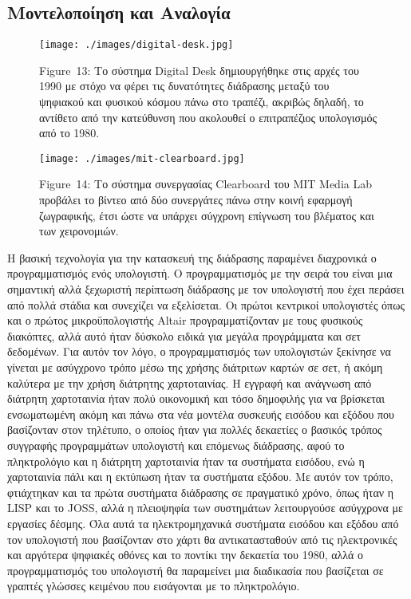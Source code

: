 \documentclass[
]{article}
\begin{document}
\hypertarget{ux3bcux3bfux3bdux3c4ux3b5ux3bbux3bfux3c0ux3bfux3afux3b7ux3c3ux3b7-ux3baux3b1ux3b9-ux3b1ux3bdux3b1ux3bbux3bfux3b3ux3afux3b1}{%
\subsection{Μοντελοποίηση και
Αναλογία}\label{ux3bcux3bfux3bdux3c4ux3b5ux3bbux3bfux3c0ux3bfux3afux3b7ux3c3ux3b7-ux3baux3b1ux3b9-ux3b1ux3bdux3b1ux3bbux3bfux3b3ux3afux3b1}}

\leavevmode{}%
\begin{figure}
\hypertarget{fig:digital-desk}{%
\centering
\texttt{[image: ./images/digital-desk.jpg]}
\caption{Figure~13: Το σύστημα Digital Desk δημιουργήθηκε στις αρχές του
1990 με στόχο να φέρει τις δυνατότητες διάδρασης μεταξύ του ψηφιακού και
φυσικού κόσμου πάνω στο τραπέζι, ακριβώς δηλαδή, το αντίθετο από την
κατεύθυνση που ακολουθεί ο επιτραπέζιος υπολογισμός από το
1980.}\label{fig:digital-desk}
}
\end{figure}

\leavevmode{}%
\begin{figure}
\hypertarget{fig:mit-clearboard}{%
\centering
\texttt{[image: ./images/mit-clearboard.jpg]}
\caption{Figure~14: Το σύστημα συνεργασίας Clearboard του MIT Media Lab
προβάλει το βίντεο από δύο συνεργάτες πάνω στην κοινή εφαρμογή
ζωγραφικής, έτσι ώστε να υπάρχει σύγχρονη επίγνωση του βλέματος και των
χειρονομιών.}\label{fig:mit-clearboard}
}
\end{figure}

Η βασική τεχνολογία για την κατασκευή της διάδρασης παραμένει διαχρονικά
ο προγραμματισμός ενός υπολογιστή. Ο προγραμματισμός με την σειρά του
είναι μια σημαντική αλλά ξεχωριστή περίπτωση διάδρασης με τον υπολογιστή
που έχει περάσει από πολλά στάδια και συνεχίζει να εξελίσεται. Οι πρώτοι
κεντρικοί υπολογιστές όπως και ο πρώτος μικροϋπολογιστής Altair
προγραμματίζονταν με τους φυσικούς διακόπτες, αλλά αυτό ήταν δύσκολο
ειδικά για μεγάλα προγράμματα και σετ δεδομένων. Για αυτόν τον λόγο, ο
προγραμματισμός των υπολογιστών ξεκίνησε να γίνεται με ασύγχρονο τρόπο
μέσω της χρήσης διάτριτων καρτών σε σετ, ή ακόμη καλύτερα με την χρήση
διάτρητης χαρτοταινίας. Η εγγραφή και ανάγνωση από διάτρητη χαρτοταινία
ήταν πολύ οικονομική και τόσο δημοφιλής για να βρίσκεται ενσωματωμένη
ακόμη και πάνω στα νέα μοντέλα συσκευής εισόδου και εξόδου που
βασίζονταν στον τηλέτυπο, ο οποίος ήταν για πολλές δεκαετίες ο βασικός
τρόπος συγγραφής προγραμμάτων υπολογιστή και επόμενως διάδρασης, αφού το
πληκτρολόγιο και η διάτρητη χαρτοταινία ήταν τα συστήματα εισόδου, ενώ η
χαρτοταινία πάλι και η εκτύπωση ήταν τα συστήματα εξόδου. Με αυτόν τον
τρόπο, φτιάχτηκαν και τα πρώτα συστήματα διάδρασης σε πραγματικό χρόνο,
όπως ήταν η LISP και το JOSS, αλλά η πλειοψηφία των συστημάτων
λειτουργούσε ασύγχρονα με εργασίες δέσμης. Όλα αυτά τα ηλεκτρομηχανικά
συστήματα εισόδου και εξόδου από τον υπολογιστή που βασίζονταν στο χάρτι
θα αντικατασταθούν από τις ηλεκτρονικές και αργότερα ψηφιακές οθόνες και
το ποντίκι την δεκαετία του 1980, αλλά ο προγραμματισμός του υπολογιστή
θα παραμείνει μια διαδικασία που βασίζεται σε γραπτές γλώσσες κειμένου
που εισάγονται με το πληκτρολόγιο.
\end{document}
